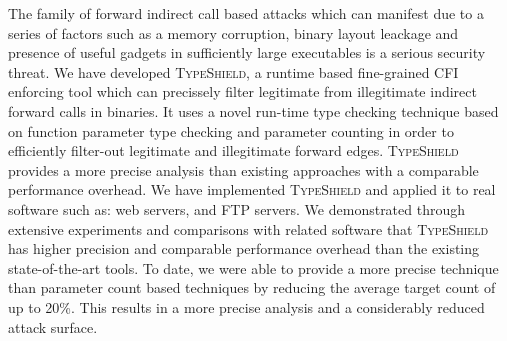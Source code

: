 The family of forward indirect call based attacks which can manifest due to a series of factors such as
a memory corruption, binary layout leackage and presence of useful
gadgets in sufficiently large executables is a serious security threat.
We have developed \textsc{TypeShield}, a runtime based fine-grained CFI enforcing
tool which can precissely filter legitimate from illegitimate indirect forward
calls in binaries.
It uses a novel run-time type checking technique based on function parameter
type checking and parameter counting in order to efficiently filter-out legitimate
and illegitimate forward edges.
\textsc{TypeShield} provides a more precise analysis than existing approaches with a
comparable performance overhead.
We have implemented \textsc{TypeShield} and applied it to real software such as:
web servers, and FTP servers.
We demonstrated through extensive experiments and comparisons with related software
that \textsc{TypeShield} has higher precision and comparable performance overhead than 
the existing state-of-the-art tools. To date, we were able to provide a more precise
technique than parameter count based techniques
by reducing the average target count of up to 20\%. This results in a more precise 
analysis and a considerably reduced attack surface.


